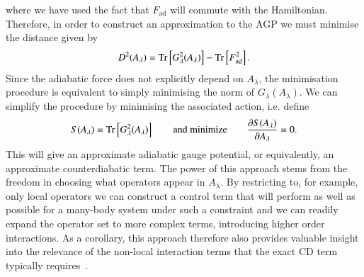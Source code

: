 where we have used the fact that $F_\text{ad}$ will commute with the Hamiltonian. Therefore, in order to construct an approximation to the AGP we must minimise the distance given by 
\begin{equation}
    D^2(A_\lambda) = \Tr \left[G_\lambda^2 (A_\lambda)\right] - \Tr \left[F_\text{ad}^2\right].
\end{equation}
Since the adiabatic force does not explicitly depend on $A_\lambda$, the minimisation procedure is equivalent to simply minimising the norm of $G_\lambda (A_\lambda)$. We can simplify the procedure by minimising the associated action, i.e. define
\begin{equation}
\label{eq:AGPaction}
    S  (A_\lambda) = \Tr \left[G_\lambda^2 (A_\lambda) \right] \qquad \text{and~minimize}\qquad   \frac{\partial S (A_\lambda)}{\partial A_\lambda} = 0.
\end{equation}
This will give an approximate adiabatic gauge potential, or equivalently, an approximate counterdiabatic term. The power of this approach stems from the freedom in choosing what operators appear in $A_\lambda$. By restricting to, for example, only local operators we can construct a control term that will perform as well as possible for a many-body system under such a constraint and we can readily expand the operator set to more complex terms, introducing higher order interactions. As a corollary, this approach therefore also provides valuable insight into the relevance of the non-local interaction terms that the exact CD term typically requires~\cite{COLD_PRXQ, CarolanPRA2022}.

